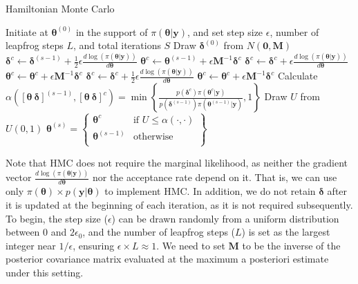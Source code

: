 \begin{algorithm}[h!]
	\caption{Hamiltonian Monte Carlo}\label{Alg:HMC}
	\begin{algorithmic}[1]
		\State Initiate at $\bm{\theta}^{(0)}$ in the support of $\pi(\bm{\theta}|\bm{y})$, and set step size $\epsilon$, number of leapfrog steps $L$, and total iterations $S$ 
		\State Draw $\bm{\delta}^{(0)}$ from $N(\bm{0}, \bm{M})$  		 			
					\State $\bm{\delta}^{c} \leftarrow \bm{\delta}^{(s-1)} + \frac{1}{2}\epsilon \frac{d\log(\pi(\bm{\theta}|\bm{y}))}{d\bm{\theta}}$
					\State $\bm{\theta}^c\leftarrow \bm{\theta}^{(s-1)}+\epsilon \bm{M}^{-1}\bm{\delta}^{c}$
				\Else
						\State $\bm{\delta}^{c} \leftarrow \bm{\delta}^{c} + \epsilon \frac{d\log(\pi(\bm{\theta}|\bm{y}))}{d\bm{\theta}}$
						\State $\bm{\theta}^c\leftarrow \bm{\theta}^c+\epsilon \bm{M}^{-1}\bm{\delta}^{c}$
					\Else
					 	\State $\bm{\delta}^{c} \leftarrow \bm{\delta}^{c} + \frac{1}{2}\epsilon \frac{d\log(\pi(\bm{\theta}|\bm{y}))}{d\bm{\theta}}$
					 	\State $\bm{\theta}^c\leftarrow \bm{\theta}^{c}+\epsilon \bm{M}^{-1}\bm{\delta}^{c}$
					\EndIf
				\EndIf
			\EndFor
		\State Calculate $\alpha([\bm{\theta} \ \bm{\delta}]^{(s-1)}, [\bm{\theta} \ \bm{\delta}]^{c}) = 
		\min\left\{\frac{p(\bm{\delta}^{c}) \pi(\bm{\theta}^{c} | \bm{y})}{p(\bm{\delta}^{(s-1)}) \pi(\bm{\theta}^{(s-1)} | \bm{y})}, 1\right\}$
		\State Draw $U$ from $U(0,1)$
		\State $\bm{\theta}^{(s)}=\begin{Bmatrix}
			\bm{\theta}^{c} & \text{if } U\leq \alpha(\cdot, \cdot)\\
			\bm{\theta}^{(s-1)} & \text{otherwise}\\
		\end{Bmatrix}$
		\EndFor 
	\end{algorithmic} 
\end{algorithm}

Note that HMC does not require the marginal likelihood, as neither the gradient vector \(\frac{d\log(\pi(\bm{\theta}|\bm{y}))}{d\bm{\theta}}\) nor the acceptance rate depend on it. That is, we can use only \(\pi(\bm{\theta})\times p(\bm{y}|\bm{\theta})\) to implement HMC. In addition, we do not retain \(\bm{\delta}\) after it is updated at the beginning of each iteration, as it is not required subsequently. To begin, the step size (\(\epsilon\)) can be drawn randomly from a uniform distribution between 0 and \(2\epsilon_0\), and the number of leapfrog steps (\(L\)) is set as the largest integer near \(1/\epsilon\), ensuring \(\epsilon \times L \approx 1\). We need to set \(\bm{M}\) to be the inverse of the posterior covariance matrix evaluated at the maximum a posteriori estimate under this setting. 

